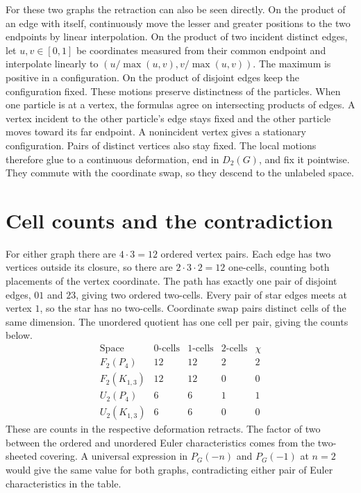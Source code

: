 \documentclass[11pt]{article}
\begin{document}
For these two graphs the retraction can also be seen directly. On the
product of an edge with itself, continuously move the lesser and greater
positions to the two endpoints by linear interpolation. On the product of
two incident distinct edges, let $u,v\in[0,1]$ be coordinates measured from
their common endpoint and interpolate linearly to
$(u/\max(u,v),v/\max(u,v))$. The maximum is positive in a configuration.
On the product of disjoint edges keep the configuration fixed. These
motions preserve distinctness of the particles. When one particle is at
a vertex, the formulas agree on intersecting products of edges. A vertex
incident to the other particle's edge stays fixed and the other particle
moves toward its far endpoint. A nonincident vertex gives a stationary
configuration. Pairs of distinct vertices also stay fixed. The local
motions therefore glue to a continuous deformation, end in $D_2(G)$, and
fix it pointwise. They commute with the coordinate swap, so they descend
to the unlabeled space.

\section*{Cell counts and the contradiction}

For either graph there are $4\cdot3=12$ ordered vertex pairs. Each edge
has two vertices outside its closure, so there are $2\cdot3\cdot2=12$
one-cells, counting both placements of the vertex coordinate. The path
has exactly one pair of disjoint edges, $01$ and $23$, giving two ordered
two-cells. Every pair of star edges meets at vertex $1$, so the star has
no two-cells. Coordinate swap pairs distinct cells of the same dimension.
The unordered quotient has one cell per pair, giving the counts below.
\[
\begin{array}{c|rrr|r}
\text{Space} & \text{0-cells} & \text{1-cells} & \text{2-cells} & \chi \\ \hline
F_2(P_4)     & 12 & 12 & 2 & 2 \\
F_2(K_{1,3}) & 12 & 12 & 0 & 0 \\
U_2(P_4)     &  6 &  6 & 1 & 1 \\
U_2(K_{1,3}) &  6 &  6 & 0 & 0
\end{array}
\]
These are counts in the respective deformation retracts. The factor of two
between the ordered and unordered Euler characteristics comes from the
two-sheeted covering. A universal expression in $P_G(-n)$ and $P_G(-1)$
at $n=2$ would give the same value for both graphs, contradicting either
pair of Euler characteristics in the table.
\end{document}
